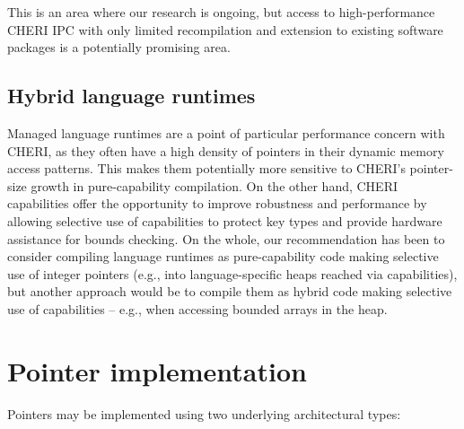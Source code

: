 \documentclass[12pt,twoside,openright,a4paper]{article}
\newcommand{\note}[2]{{\color{blue}[ Note: #1 - #2]}}
\renewcommand{\note}[2]{\relax\ifhmode\unskip\fi}
\newcommand{\psnote}[1]{\note{#1}{Peter S.}}
\newcommand{\dcnote}[1]{\note{#1}{David}}
\begin{document}
This is an area where our research is ongoing, but access to high-performance
CHERI IPC with only limited recompilation and extension to existing software
packages is a potentially promising area.

\subsection{Hybrid language runtimes}

Managed language runtimes are a point of particular performance concern with
CHERI, as they often have a high density of pointers in their dynamic memory
access patterns.
This makes them potentially more sensitive to CHERI's pointer-size growth in
pure-capability compilation.
On the other hand, CHERI capabilities offer the opportunity to improve
robustness and performance by allowing selective use of capabilities to
protect key types and provide hardware assistance for bounds checking.
On the whole, our recommendation has been to consider compiling language
runtimes as pure-capability code making selective use of integer pointers
(e.g., into language-specific heaps reached via capabilities), but
another approach would be to compile them as hybrid code making selective use
of capabilities -- e.g., when accessing bounded arrays in the heap.
\dcnote{It feels quite dangerous to have a single sentence about the
recommended way of doing things and a long document about the not-recommended
way.}

\section{Pointer implementation}

\psnote{In hybrid CHERI C/C++...}

Pointers may be implemented using two underlying architectural types:
\end{document}
